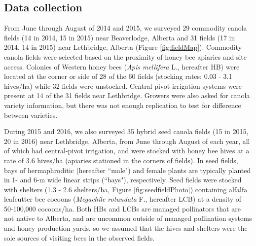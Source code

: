 \documentclass[12pt]{article} %
\begin{document}
\subsection*{Data collection}
From June through August of 2014 and 2015, we surveyed 29 commodity canola fields (14 in 2014, 15 in 2015) near Beaverlodge, Alberta and 31 fields (17 in 2014, 14 in 2015) near Lethbridge, Alberta (Figure \ref{fig:fieldMap}).
Commodity canola fields were selected based on the proximity of honey bee apiaries and site access. 
Colonies of Western honey bees (\emph{Apis mellifera} L., hereafter HB) were located at the corner or side of 28 of the 60 fields (stocking rates: 0.03 - 3.1 hives/ha) while 32 fields were unstocked. %
Central-pivot irrigation systems were present at 14 of the 31 fields near Lethbridge.
Growers were also asked for canola variety information, but there was not enough replication to test for difference between varieties.

During 2015 and 2016, we also surveyed 35 hybrid seed canola fields (15 in 2015, 20 in 2016) near Lethbridge, Alberta, from June through August of each year, all of which had central-pivot irrigation, and were stocked with honey bee hives at a rate of 3.6 hives/ha (apiaries stationed in the corners of fields).
In seed fields, bays of hermaphroditic (hereafter ``male") and female plants are typically planted in 1- and 6-m wide linear strips (``bays"), respectively. 
Seed fields were stocked with shelters (1.3 - 2.6 shelters/ha, Figure \ref{fig:seedfieldPhoto}) containing alfalfa leafcutter bee cocoons (\textit{Megachile rotundata} F., hereafter LCB) at a density of 50-100,000 cocoons/ha. 
Both HBs and LCBs are managed pollinators that are not native to Alberta, and are uncommon outside of managed pollination systems and honey production yards, so we assumed that the hives and shelters were the sole sources of visiting bees in the observed fields.

\end{document}
